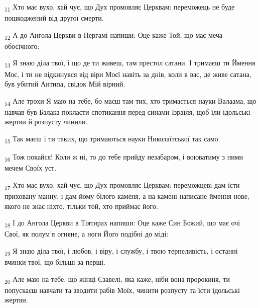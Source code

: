 \begin{tcolorbox}
\textsubscript{11} Хто має вухо, хай чує, що Дух промовляє Церквам: переможець не буде пошкоджений від другої смерти.
\end{tcolorbox}
\begin{tcolorbox}
\textsubscript{12} А до Ангола Церкви в Пергамі напиши: Оце каже Той, що має меча обосічного:
\end{tcolorbox}
\begin{tcolorbox}
\textsubscript{13} Я знаю діла твої, і що де ти живеш, там престол сатани. І тримаєш ти Ймення Моє, і ти не відкинувся від віри Моєї навіть за днів, коли в вас, де живе сатана, був убитий Антипа, свідок Мій вірний.
\end{tcolorbox}
\begin{tcolorbox}
\textsubscript{14} Але трохи Я маю на тебе, бо маєш там тих, хто тримається науки Валаама, що навчав був Балака покласти спотикання перед синами Ізраїля, щоб їли ідольські жертви й розпусту чинили.
\end{tcolorbox}
\begin{tcolorbox}
\textsubscript{15} Так маєш і ти таких, що тримаються науки Николаїтської так само.
\end{tcolorbox}
\begin{tcolorbox}
\textsubscript{16} Тож покайся! Коли ж ні, то до тебе прийду незабаром, і воюватиму з ними мечем Своїх уст.
\end{tcolorbox}
\begin{tcolorbox}
\textsubscript{17} Хто має вухо, хай чує, що Дух промовляє Церквам: переможцеві дам їсти приховану манну, і дам йому білого каменя, а на камені написане ймення нове, якого не знає ніхто, тільки той, хто приймає його.
\end{tcolorbox}
\begin{tcolorbox}
\textsubscript{18} І до Ангола Церкви в Тіятирах напиши: Оце каже Син Божий, що має очі Свої, як полум'я огняне, а ноги Його подібні до міді:
\end{tcolorbox}
\begin{tcolorbox}
\textsubscript{19} Я знаю діла твої, і любов, і віру, і службу, і твою терпеливість, і останні вчинки твої, що більші за перші.
\end{tcolorbox}
\begin{tcolorbox}
\textsubscript{20} Але маю на тебе, що жінці Єзавелі, яка каже, ніби вона пророкиня, ти попускаєш навчати та зводити рабів Моїх, чинити розпусту та їсти ідольські жертви.
\end{tcolorbox}
